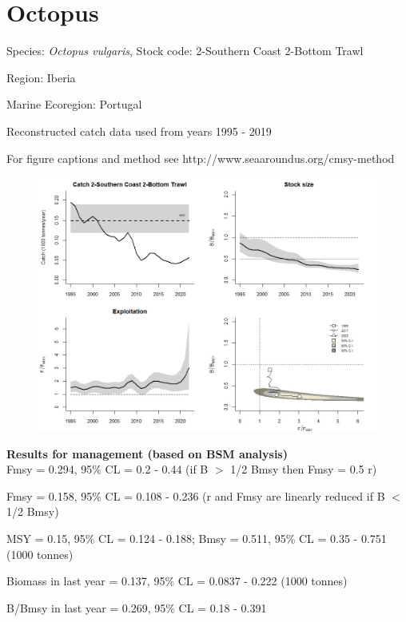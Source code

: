 \documentclass[12pt,a4paper]{article}\usepackage[]{graphicx}\usepackage[]{xcolor}
\begin{document}
    \section*{Octopus}


    Species: \emph{Octopus vulgaris}, Stock code: 2-Southern Coast 2-Bottom Trawl

Region: Iberia

Marine Ecoregion: Portugal

Reconstructed catch data used from years 1995 - 2019 

 For figure captions and method see http://www.seaaroundus.org/cmsy-method

    \begin{figure}[ht]
    \centering
    \includegraphics[width=1.00\textwidth ext=.jpg type=jpg]{2-Southern Coast 2-Bottom Trawl_MAN.jpg}
    \end{figure}

    \textbf{Results for management (based on BSM analysis)}\\

Fmsy = 0.294, 95\% CL = 0.2 - 0.44 (if B $>$ 1/2 Bmsy then Fmsy = 0.5 r)

Fmsy = 0.158, 95\% CL = 0.108 - 0.236 (r and Fmsy are linearly reduced if B $<$ 1/2 Bmsy)

MSY = 0.15,  95\% CL = 0.124 - 0.188; Bmsy = 0.511,  95\% CL = 0.35 - 0.751 (1000 tonnes)

Biomass in last year = 0.137, 95\% CL = 0.0837 - 0.222 (1000 tonnes)

B/Bmsy in last year = 0.269, 95\% CL = 0.18 - 0.391
\end{document}
